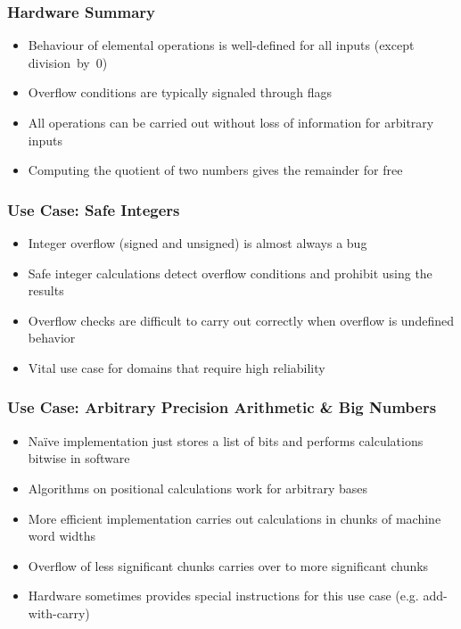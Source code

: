 \documentclass[aspectratio=169]{beamer}
\begin{document}
\begin{frame}
  \frametitle{Hardware Summary}
  
  \begin{itemize}
  \item Behaviour of elemental operations is well-defined for all inputs (except division~by~$0$)
  \item Overflow conditions are typically signaled through flags
  \item All operations can be carried out without loss of information for arbitrary inputs
  \item Computing the quotient of two numbers gives the remainder for free
  \end{itemize}

\end{frame}

\begin{frame}
  \frametitle{Use Case: Safe Integers}
  
  \begin{itemize}
    \item Integer overflow (signed and unsigned) is almost always a bug
    \item Safe integer calculations detect overflow conditions and prohibit using the results
    \item Overflow checks are difficult to carry out correctly when overflow is undefined behavior
    \item Vital use case for domains that require high reliability
  \end{itemize}
\end{frame}

\begin{frame}
  \frametitle{Use Case: Arbitrary Precision Arithmetic \& Big Numbers}
  
  \begin{itemize}
    \item Naïve implementation just stores a list of bits and performs calculations bitwise in software
    \item Algorithms on positional calculations work for arbitrary bases
    \item More efficient implementation carries out calculations in chunks of machine word widths
    \item Overflow of less significant chunks carries over to more significant chunks
    \item Hardware sometimes provides special instructions for this use case (e.g. add-with-carry)
  \end{itemize}
\end{frame}
\end{document}
